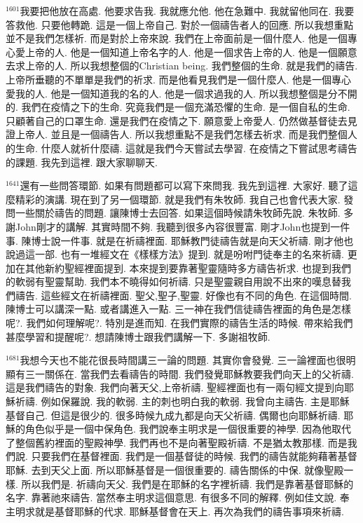 \documentclass{book}
\begin{document}
$^{1601}$我要把他放在高處.
他要求告我.
我就應允他.
他在急難中.
我就留他同在.
我要答救他.
只要他轉跪.
這是一個上帝自己.
對於一個禱告者人的回應.
所以我想重點並不是我們怎樣祈.
而是對於上帝來說.
我們在上帝面前是一個什麼人.
他是一個專心愛上帝的人.
他是一個知道上帝名字的人.
他是一個求告上帝的人.
他是一個願意去求上帝的人.
所以我想整個的Christian being.
我們整個的生命.
就是我們的禱告.
上帝所垂聽的不單單是我們的祈求.
而是他看見我們是一個什麼人.
他是一個專心愛我的人.
他是一個知道我的名的人.
他是一個求過我的人.
所以我想整個是分不開的.
我們在疫情之下的生命.
究竟我們是一個充滿恐懼的生命.
是一個自私的生命.
只顧著自己的口罩生命.
還是我們在疫情之下.
願意愛上帝愛人.
仍然做基督徒去見證上帝人.
並且是一個禱告人.
所以我想重點不是我們怎樣去祈求.
而是我們整個人的生命.
什麼人就祈什麼禱.
這就是我們今天嘗試去學習.
在疫情之下嘗試思考禱告的課題.
我先到這裡.
跟大家聊聊天.

$^{1641}$還有一些問答環節.
如果有問題都可以寫下來問我.
我先到這裡.
大家好.
聽了這麼精彩的演講.
現在到了另一個環節.
就是我們有朱牧師.
我自己也會代表大家.
發問一些關於禱告的問題.
讓陳博士去回答.
如果這個時候請朱牧師先說.
朱牧師.
多謝John剛才的講解.
其實時間不夠.
我聽到很多內容很豐富.
剛才John也提到一件事.
陳博士說一件事.
就是在祈禱裡面.
耶穌教門徒禱告就是向天父祈禱.
剛才他也說過這一部.
也有一堆經文在《樣樣方法》提到.
就是吩咐門徒奉主的名來祈禱.
更加在其他新約聖經裡面提到.
本來提到要靠著聖靈隨時多方禱告祈求.
也提到我們的軟弱有聖靈幫助.
我們本不曉得如何祈禱.
只是聖靈親自用說不出來的嘆息替我們禱告.
這些經文在祈禱裡面.
聖父,聖子,聖靈.
好像也有不同的角色.
在這個時間.
陳博士可以講深一點.
或者講進入一點.
三一神在我們信徒禱告裡面的角色是怎樣呢?.
我們如何理解呢?.
特別是進而知.
在我們實際的禱告生活的時候.
帶來給我們甚麼學習和提醒呢?.
想請陳博士跟我們講解一下.
多謝祖牧師.

$^{1681}$我想今天也不能花很長時間講三一論的問題.
其實你會發覺.
三一論裡面也很明顯有三一關係在.
當我們去看禱告的時間.
我們發覺耶穌教要我們向天上的父祈禱.
這是我們禱告的對象.
我們向著天父,上帝祈禱.
聖經裡面也有一兩句經文提到向耶穌祈禱.
例如保羅說.
我的軟弱.
主的刺也明白我的軟弱.
我曾向主禱告.
主是耶穌基督自己.
但這是很少的.
很多時候九成九都是向天父祈禱.
偶爾也向耶穌祈禱.
耶穌的角色似乎是一個中保角色.
我們說奉主明求是一個很重要的神學.
因為他取代了整個舊約裡面的聖殿神學.
我們再也不是向著聖殿祈禱.
不是猶太教那樣.
而是我們說.
只要我們在基督裡面.
我們是一個基督徒的時候.
我們的禱告就能夠藉著基督耶穌.
去到天父上面.
所以耶穌基督是一個很重要的.
禱告關係的中保.
就像聖殿一樣.
所以我們是.
祈禱向天父.
我們是在耶穌的名字裡祈禱.
我們是靠著基督耶穌的名字.
靠著祂來禱告.
當然奉主明求這個意思.
有很多不同的解釋.
例如佳文說.
奉主明求就是基督耶穌的代求.
耶穌基督會在天上.
再次為我們的禱告事項來祈禱.
\end{document}
